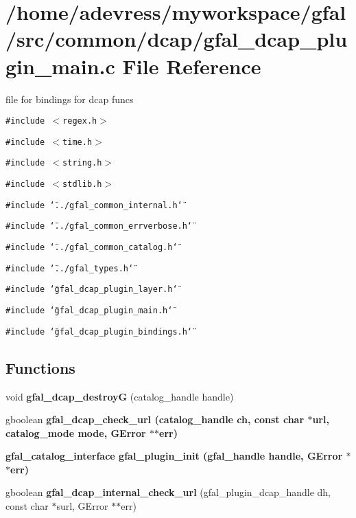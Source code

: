 \section{/home/adevress/myworkspace/gfal/src/common/dcap/gfal\_\-dcap\_\-plugin\_\-main.c File Reference}
\label{gfal__dcap__plugin__main_8c}
file for bindings for dcap funcs 

{\tt \#include $<$regex.h$>$}\par
{\tt \#include $<$time.h$>$}\par
{\tt \#include $<$string.h$>$}\par
{\tt \#include $<$stdlib.h$>$}\par
{\tt \#include \char`\"{}../gfal\_\-common\_\-internal.h\char`\"{}}\par
{\tt \#include \char`\"{}../gfal\_\-common\_\-errverbose.h\char`\"{}}\par
{\tt \#include \char`\"{}../gfal\_\-common\_\-catalog.h\char`\"{}}\par
{\tt \#include \char`\"{}../gfal\_\-types.h\char`\"{}}\par
{\tt \#include \char`\"{}gfal\_\-dcap\_\-plugin\_\-layer.h\char`\"{}}\par
{\tt \#include \char`\"{}gfal\_\-dcap\_\-plugin\_\-main.h\char`\"{}}\par
{\tt \#include \char`\"{}gfal\_\-dcap\_\-plugin\_\-bindings.h\char`\"{}}\par
\subsection*{Functions}
\begin{CompactItemize}
\item 
void \textbf{gfal\_\-dcap\_\-destroy\-G} (catalog\_\-handle handle)\label{gfal__dcap__plugin__main_8c_3cf3ae23969060c6a7237d026e6b75b1}

\item 
gboolean \bf{gfal\_\-dcap\_\-check\_\-url} (catalog\_\-handle ch, const char $\ast$url, catalog\_\-mode mode, GError $\ast$$\ast$err)
\item 
\bf{gfal\_\-catalog\_\-interface} \bf{gfal\_\-plugin\_\-init} (gfal\_\-handle handle, GError $\ast$$\ast$err)
\item 
gboolean \textbf{gfal\_\-dcap\_\-internal\_\-check\_\-url} (gfal\_\-plugin\_\-dcap\_\-handle dh, const char $\ast$surl, GError $\ast$$\ast$err)\label{gfal__dcap__plugin__main_8c_73fbacad3f9f3025a24c39f4d1dfad2d}

\end{CompactItemize}


